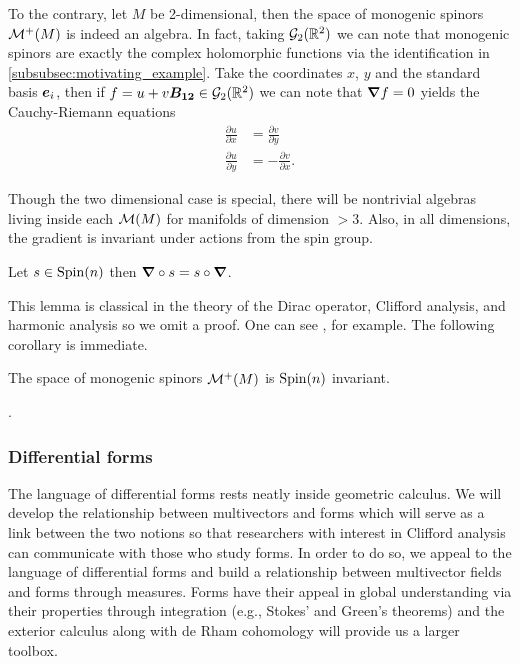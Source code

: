 To the contrary, let $M$ be 2-dimensional, then the space of monogenic spinors $\mathcal{M}^+(M)$ is indeed an algebra. In fact, taking $\mathcal{G}_2(\mathbb{R}^2)$ we can note that monogenic spinors are exactly the complex holomorphic functions via the identification in \cref{subsubsec:motivating_example}. Take the coordinates $x$, $y$ and the standard basis $\boldsymbol{e}_i$, then if $f=u+v\boldsymbol{B_{12}} \in \mathcal{G}_2(\mathbb{R}^2)$ we can note that $\boldsymbol{\nabla} f =0$ yields the Cauchy-Riemann equations
\begin{align}
    \frac{\partial u}{\partial x} &= \frac{\partial v}{\partial y}\\
    \frac{\partial u}{\partial y} &= -\frac{\partial v}{\partial x}.
\end{align}

Though the two dimensional case is special, there will be nontrivial algebras living inside each $\mathcal{M}(M)$ for manifolds of dimension $>3$. Also, in all dimensions, the gradient is invariant under actions from the spin group.
\begin{lemma}
\label{lem:clifford_invariant}
Let $s\in \operatorname{Spin}(n)$ then $\boldsymbol{\nabla} \circ s = s \circ \boldsymbol{\nabla}$.
\end{lemma}
This lemma is classical in the theory of the Dirac operator, Clifford analysis, and harmonic analysis so we omit a proof.  One can see \cite{janssens_special_nodate}, for example. The following corollary is immediate.
\begin{corollary}
The space of monogenic spinors $\mathcal{M}^+(M)$ is $\operatorname{Spin}(n)$ invariant.
\end{corollary}
.

\subsubsection{Differential forms}
\label{subsubsec:differential_forms}

The language of differential forms rests neatly inside geometric calculus. We will develop the relationship between multivectors and forms which will serve as a link between the two notions so that researchers with interest in Clifford analysis can communicate with those who study forms. In order to do so, we appeal to the language of differential forms and build a relationship between multivector fields and forms through measures. Forms have their appeal in global understanding via their properties through integration (e.g., Stokes' and Green's theorems) and the exterior calculus along with de Rham cohomology will provide us a larger toolbox.

